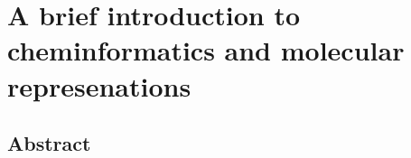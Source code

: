 \chapter{A brief introduction to cheminformatics and molecular represenations}
\thispagestyle{plain}
\vspace{-.5cm}

\section*{Abstract}
    \dsp
    


